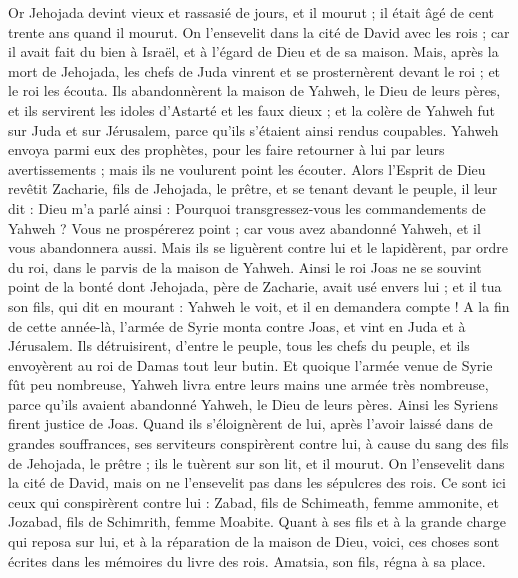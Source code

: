 \begin{multicols}{2}
Or Jehojada devint vieux et rassasié de jours, et il mourut ; il était âgé de cent trente ans quand il mourut.
On l'ensevelit dans la cité de David avec les rois ; car il avait fait du bien à Israël, et à l'égard de Dieu et de sa maison.
Mais, après la mort de Jehojada, les chefs de Juda vinrent et se prosternèrent devant le roi ; et le roi les écouta.
Ils abandonnèrent la maison de Yahweh, le Dieu de leurs pères, et ils servirent les idoles d'Astarté et les faux dieux ; et la colère de Yahweh fut sur Juda et sur Jérusalem, parce qu'ils s'étaient ainsi rendus coupables.
Yahweh envoya parmi eux des prophètes, pour les faire retourner à lui par leurs avertissements ; mais ils ne voulurent point les écouter.
Alors l'Esprit de Dieu revêtit Zacharie, fils de Jehojada, le prêtre, et se tenant devant le peuple, il leur dit : Dieu m'a parlé ainsi : Pourquoi transgressez-vous les commandements de Yahweh ? Vous ne prospérerez point ; car vous avez abandonné Yahweh, et il vous abandonnera aussi.
Mais ils se liguèrent contre lui et le lapidèrent, par ordre du roi, dans le parvis de la maison de Yahweh.
Ainsi le roi Joas ne se souvint point de la bonté dont Jehojada, père de Zacharie, avait usé envers lui ; et il tua son fils, qui dit en mourant : Yahweh le voit, et il en demandera compte !
A la fin de cette année-là, l'armée de Syrie monta contre Joas, et vint en Juda et à Jérusalem. Ils détruisirent, d'entre le peuple, tous les chefs du peuple, et ils envoyèrent au roi de Damas tout leur butin.
Et quoique l'armée venue de Syrie fût peu nombreuse, Yahweh livra entre leurs mains une armée très nombreuse, parce qu'ils avaient abandonné Yahweh, le Dieu de leurs pères. Ainsi les Syriens firent justice de Joas.
Quand ils s'éloignèrent de lui, après l'avoir laissé dans de grandes souffrances, ses serviteurs conspirèrent contre lui, à cause du sang des fils de Jehojada, le prêtre ; ils le tuèrent sur son lit, et il mourut. On l'ensevelit dans la cité de David, mais on ne l'ensevelit pas dans les sépulcres des rois.
Ce sont ici ceux qui conspirèrent contre lui : Zabad, fils de Schimeath, femme ammonite, et Jozabad, fils de Schimrith, femme Moabite.
Quant à ses fils et à la grande charge qui reposa sur lui, et à la réparation de la maison de Dieu, voici, ces choses sont écrites dans les mémoires du livre des rois. Amatsia, son fils, régna à sa place.

\end{multicols}
